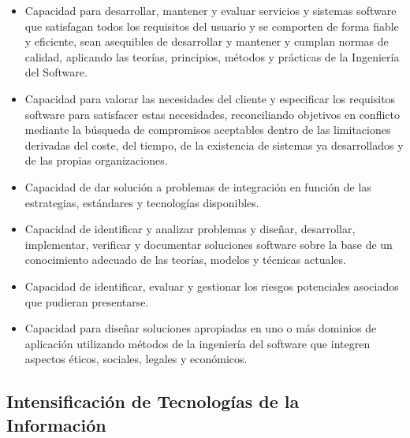 \documentclass{pre-tfg}
\begin{document}
\begin{itemize}
\item Capacidad para desarrollar, mantener y evaluar servicios y sistemas software que
  satisfagan todos los requisitos del usuario y se comporten de forma fiable y eficiente,
  sean asequibles de desarrollar y mantener y cumplan normas de calidad, aplicando las
  teorías, principios, métodos y prácticas de la Ingeniería del Software.
\item Capacidad para valorar las necesidades del cliente y especificar los requisitos
  software para satisfacer estas necesidades, reconciliando objetivos en conflicto
  mediante la búsqueda de compromisos aceptables dentro de las limitaciones derivadas del
  coste, del tiempo, de la existencia de sistemas ya desarrollados y de las propias
  organizaciones.
\item Capacidad de dar solución a problemas de integración en función de las estrategias,
  estándares y tecnologías disponibles.
\item Capacidad de identificar y analizar problemas y diseñar, desarrollar, implementar,
  verificar y documentar soluciones software sobre la base de un conocimiento adecuado de
  las teorías, modelos y técnicas actuales.
\item Capacidad de identificar, evaluar y gestionar los riesgos potenciales asociados que pudieran presentarse.
\item Capacidad para diseñar soluciones apropiadas en uno o más dominios de aplicación
  utilizando métodos de la ingeniería del software que integren aspectos éticos, sociales,
  legales y económicos.
\end{itemize}


\subsection*{Intensificación de Tecnologías de la Información}
\end{document}
